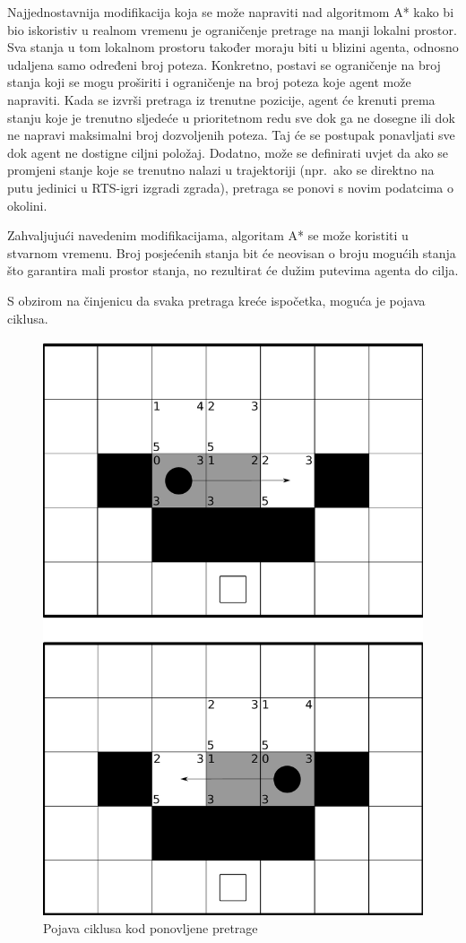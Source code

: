 \documentclass[times, utf8, zavrsni, numeric]{fer}
\begin{document}
\par Najjednostavnija modifikacija koja se može napraviti nad algoritmom A* kako bi bio iskoristiv u realnom vremenu je ograničenje pretrage na manji lokalni prostor.
Sva stanja u tom lokalnom prostoru također moraju biti u blizini agenta, odnosno udaljena samo određeni broj poteza.
Konkretno, postavi se ograničenje na broj stanja koji se mogu proširiti i ograničenje na broj poteza koje agent može napraviti.
Kada se izvrši pretraga iz trenutne pozicije, agent će krenuti prema stanju koje je trenutno sljedeće u prioritetnom redu sve dok ga ne dosegne ili dok ne napravi maksimalni broj dozvoljenih poteza.
Taj će se postupak ponavljati sve dok agent ne dostigne ciljni položaj.
Dodatno, može se definirati uvjet da ako se promjeni stanje koje se trenutno nalazi u trajektoriji (npr.\ ako se direktno na putu jedinici u RTS-igri izgradi zgrada), pretraga se ponovi s novim podatcima o okolini.

\par Zahvaljujući navedenim modifikacijama, algoritam A* se može koristiti u stvarnom vremenu. 
Broj posjećenih stanja bit će neovisan o broju mogućih stanja što garantira mali prostor stanja, no rezultirat će dužim putevima agenta do cilja.

\par S obzirom na činjenicu da svaka pretraga kreće ispočetka, moguća je pojava ciklusa. 

\begin{figure}[h]
	\centering
	\includegraphics[width=0.45\linewidth]{images/repeatedAStarCycle.pdf}
	\caption{Pojava ciklusa kod ponovljene pretrage}
	\label{fig:pathfindingCycle}
\end{figure} 
\end{document}
